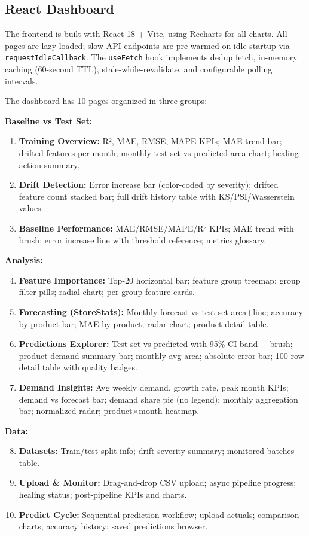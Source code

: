 \documentclass[conference]{IEEEtran}
\begin{document}
\subsection{React Dashboard}

The frontend is built with React 18 + Vite, using Recharts for all charts. All pages are lazy-loaded; slow API endpoints are pre-warmed on idle startup via \texttt{requestIdleCallback}. The \texttt{useFetch} hook implements dedup fetch, in-memory caching (60-second TTL), stale-while-revalidate, and configurable polling intervals.

The dashboard has 10 pages organized in three groups:

\textbf{Baseline vs Test Set:}
\begin{enumerate}
    \item \textbf{Training Overview:} R², MAE, RMSE, MAPE KPIs; MAE trend bar; drifted features per month; monthly test set vs predicted area chart; healing action summary.
    \item \textbf{Drift Detection:} Error increase bar (color-coded by severity); drifted feature count stacked bar; full drift history table with KS/PSI/Wasserstein values.
    \item \textbf{Baseline Performance:} MAE/RMSE/MAPE/R² KPIs; MAE trend with brush; error increase line with threshold reference; metrics glossary.
\end{enumerate}

\textbf{Analysis:}
\begin{enumerate}
    \setcounter{enumi}{3}
    \item \textbf{Feature Importance:} Top-20 horizontal bar; feature group treemap; group filter pills; radial chart; per-group feature cards.
    \item \textbf{Forecasting (StoreStats):} Monthly forecast vs test set area+line; accuracy by product bar; MAE by product; radar chart; product detail table.
    \item \textbf{Predictions Explorer:} Test set vs predicted with 95\% CI band + brush; product demand summary bar; monthly avg area; absolute error bar; 100-row detail table with quality badges.
    \item \textbf{Demand Insights:} Avg weekly demand, growth rate, peak month KPIs; demand vs forecast bar; demand share pie (no legend); monthly aggregation bar; normalized radar; product$\times$month heatmap.
\end{enumerate}

\textbf{Data:}
\begin{enumerate}
    \setcounter{enumi}{7}
    \item \textbf{Datasets:} Train/test split info; drift severity summary; monitored batches table.
    \item \textbf{Upload \& Monitor:} Drag-and-drop CSV upload; async pipeline progress; healing status; post-pipeline KPIs and charts.
    \item \textbf{Predict Cycle:} Sequential prediction workflow; upload actuals; comparison charts; accuracy history; saved predictions browser.
\end{enumerate}
\end{document}
